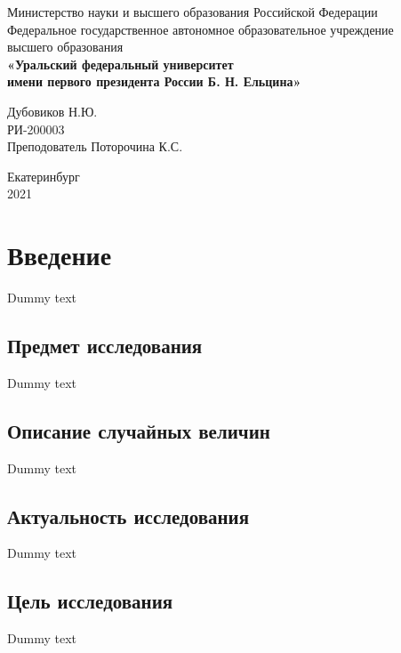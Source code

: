 \documentclass[titlepage]{article}
\begin{document}
\begin{titlepage}

\begin{center}
	Министерство науки и высшего образования Российской Федерации\\
	Федеральное государственное автономное образовательное учреждение\\
	высшего образования\\
	\textbf{«Уральский федеральный университет\\
	имени первого президента России Б. Н. Ельцина»}
\end{center}

\vspace*{9em}{\centering\Huge
	Итоговая рассчётная работа по статистике\par}
\vspace{9em}

\begin{flushright}
	Дубовиков Н.Ю. \\ РИ-200003 \\ Преподователь Поторочина К.С.
\end{flushright}

\mbox{}
\vfill
\begin{center}
	Екатеринбург\\
	2021
\end{center}
\clearpage
\end{titlepage}

\tableofcontents
\newpage

\section{Введение}

Dummy text

\subsection{Предмет исследования}

Dummy text

\subsection{Описание случайных величин}

Dummy text

\subsection{Актуальность исследования}

Dummy text

\subsection{Цель исследования}

Dummy text
\end{document}

